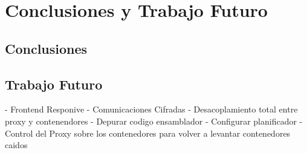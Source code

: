 \chapter{Conclusiones y Trabajo Futuro}\label{chap:conclusiones}
\section{Conclusiones}

\section{Trabajo Futuro}
\begin{itemize}
    - Frontend Responive
    - Comunicaciones Cifradas
    - Desacoplamiento total entre proxy y contenendores
    - Depurar codigo ensamblador
    - Configurar planificador
    - Control del Proxy sobre los contenedores para volver a levantar contenedores caidos
\end{itemize}